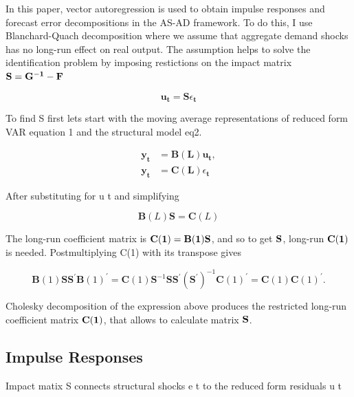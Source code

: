 \documentclass[a4paper,12pt]{article}
\begin{document}
In this paper, vector autoregression is used to obtain impulse responses and forecast error decompositions in the AS-AD framework. To do this, I use Blanchard-Quach decomposition where we assume that aggregate demand shocks has no long-run effect on real output. The assumption helps to solve the identification problem by imposing restictions on the impact matrix \(\bf S = G^{-1}-F\)

\begin{equation}
		\mathbf{u}_{\mathbf{t}}=\mathbf{S} \epsilon_{\mathbf{t}}
\end{equation}

To find S first lets start with the moving average representations of reduced form VAR equation 1 and the structural model eq2.

\begin{equation}
\begin{split}
		\mathbf{y}_{\mathbf{t}} &=\mathbf{B}(\mathbf{L}) \mathbf{u}_{\mathbf{t}}, \\
		\mathbf{y}_{\mathbf{t}} &=\mathbf{C}(\mathbf{L}) \epsilon_{\mathbf{t}}
\end{split}
\end{equation}

After substituting for u t and simplifying

\begin{equation}
		\mathbf{B}(L) \mathbf{S}=\mathbf{C}(L)
\end{equation}

The long-run coefficient matrix is \(\bf C(1) = B(1)S\), and so to get \(\bf S\), long-run \(\bf C(1)\) is needed. Postmultiplying C(1) with its transpose gives

\begin{equation}
		\mathbf{B}(1) \mathbf{S S}^{\prime} \mathbf{B}(1)^{\prime}=\mathbf{C}(1) \mathbf{S}^{-1} \mathbf{S} \mathbf{S}^{\prime}\left(\mathbf{S}^{\prime}\right)^{-1} \mathbf{C}(1)^{\prime}=\mathbf{C}(1) \mathbf{C}(1)^{\prime}.
\end{equation}

Cholesky decomposition of the expression above produces the restricted long-run coefficient matrix \(\bf C(1)\), that allows to calculate matrix \(\bf S\).

\subsection{Impulse Responses}

Impact matix S connects structural shocks e t to the reduced form residuals u t
\end{document}
